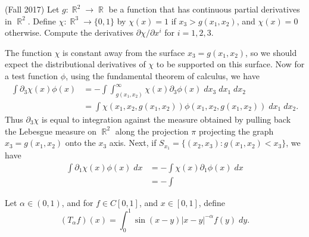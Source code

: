 \documentclass[answers]{exam}
\DeclareMathOperator{\RR}{\mathbb{R}}
\theoremstyle{problemstyle}
\newcommand{\1}[1]{\textbf{1}_{\left[#1\right]}} %
\begin{document}
\begin{questions}
\question (Fall 2017) Let $g: \RR^2 \to \RR$ be a function that has continuous partial derivatives in $\RR^2$. Define $\chi: \RR^3 \to \{ 0, 1 \}$ by $\chi(x) = 1$ if $x_3 > g(x_1,x_2)$, and $\chi(x) = 0$ otherwise. Compute the derivatives $\partial \chi / \partial x^i$ for $i = 1, 2, 3$.
\begin{solution}
		The function $\chi$ is constant away from the surface $x_3 = g(x_1,x_2)$, so we should expect the distributional derivatives of $\chi$ to be supported on this surface. Now for a test function $\phi$, using the fundamental theorem of calculus, we have
		\begin{align*}
			\int \partial_3 \chi(x) \phi(x) &= - \int \int_{g(x_1,x_2)}^\infty \chi(x) \partial_3 \phi(x)\; dx_3 \; dx_1\; dx_2\\
			&= \int \chi(x_1,x_2, g(x_1,x_2)) \phi(x_1,x_2,g(x_1,x_2))\; dx_1\; dx_2.
		\end{align*}
		Thus $\partial_3 \chi$ is equal to integration against the measure obtained by pulling back the Lebesgue measure on $\RR^2$ along the projection $\pi$ projecting the graph $x_3 = g(x_1,x_2)$ onto the $x_3$ axis. Next, if $S_{x_1} = \{ (x_2,x_3): g(x_1,x_2) < x_3 \}$, we have
		\begin{align*}
			\int \partial_1 \chi(x) \phi(x)\; dx &= - \int \chi(x) \partial_1 \phi(x)\; dx\\
			&= - \int 
		\end{align*}
\end{solution}

\question Let $\alpha \in (0,1)$, and for $f \in C[0,1]$, and $x \in [0,1]$, define
%
\[ (T_\alpha f)(x) = \int_0^1 \sin(x-y) |x-y|^{-\alpha} f(y)\; dy. \]
\begin{parts}

\end{parts}
\end{questions}
\end{document}

